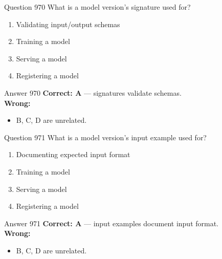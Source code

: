 \documentclass[aspectratio=169,11pt]{beamer}
\begin{document}
	\begin{frame}{Question 970}
		What is a model version's signature used for?
		\begin{enumerate}[label=\Alph*.]
			\item Validating input/output schemas
			\item Training a model
			\item Serving a model
			\item Registering a model
		\end{enumerate}
	\end{frame}
	\begin{frame}{Answer 970}
		\textbf{Correct: A} --- signatures validate schemas.\\
		\vspace{0.5em}
		\textbf{Wrong:}
		\begin{itemize}
			\item B, C, D are unrelated.
		\end{itemize}
	\end{frame}
	
	\begin{frame}{Question 971}
		What is a model version's input example used for?
		\begin{enumerate}[label=\Alph*.]
			\item Documenting expected input format
			\item Training a model
			\item Serving a model
			\item Registering a model
		\end{enumerate}
	\end{frame}
	\begin{frame}{Answer 971}
		\textbf{Correct: A} --- input examples document input format.\\
		\vspace{0.5em}
		\textbf{Wrong:}
		\begin{itemize}
			\item B, C, D are unrelated.
		\end{itemize}
	\end{frame}
	
\end{document}
